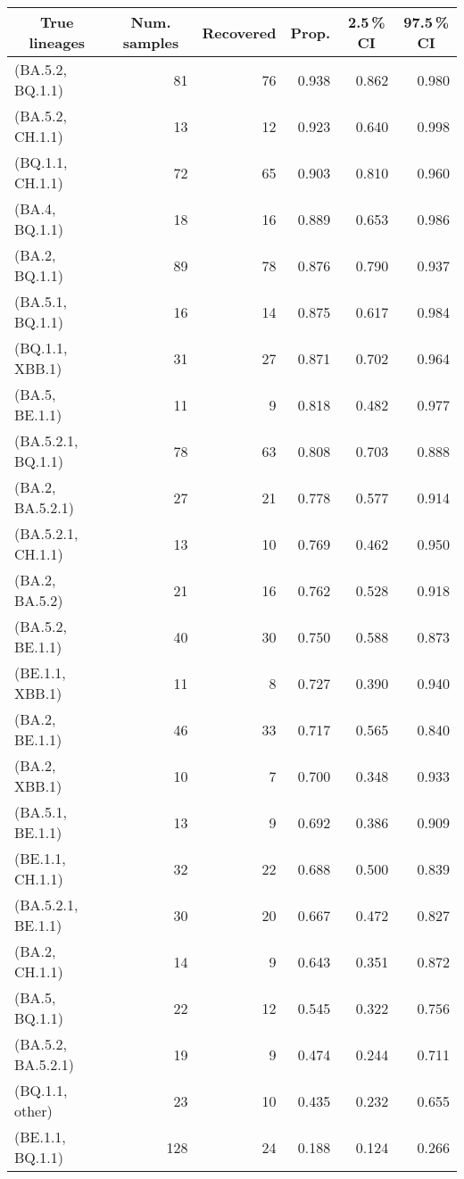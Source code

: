 \begin{tabular}{@{}lrrrrr@{}}
\toprule
\multicolumn{1}{c}{True lineages} & \multicolumn{1}{c}{Num. samples} & \multicolumn{1}{c}{Recovered} & \multicolumn{1}{c}{Prop.} & \multicolumn{1}{c}{2.5\,\% CI} & \multicolumn{1}{c}{97.5\,\% CI} \\
\midrule
(BA.5.2, BQ.1.1) & 81 & 76 & 0.938 & 0.862 & 0.980 \\
(BA.5.2, CH.1.1) & 13 & 12 & 0.923 & 0.640 & 0.998 \\
(BQ.1.1, CH.1.1) & 72 & 65 & 0.903 & 0.810 & 0.960 \\
(BA.4, BQ.1.1) & 18 & 16 & 0.889 & 0.653 & 0.986 \\
(BA.2, BQ.1.1) & 89 & 78 & 0.876 & 0.790 & 0.937 \\
(BA.5.1, BQ.1.1) & 16 & 14 & 0.875 & 0.617 & 0.984 \\
(BQ.1.1, XBB.1) & 31 & 27 & 0.871 & 0.702 & 0.964 \\
(BA.5, BE.1.1) & 11 & 9 & 0.818 & 0.482 & 0.977 \\
(BA.5.2.1, BQ.1.1) & 78 & 63 & 0.808 & 0.703 & 0.888 \\
(BA.2, BA.5.2.1) & 27 & 21 & 0.778 & 0.577 & 0.914 \\
(BA.5.2.1, CH.1.1) & 13 & 10 & 0.769 & 0.462 & 0.950 \\
(BA.2, BA.5.2) & 21 & 16 & 0.762 & 0.528 & 0.918 \\
(BA.5.2, BE.1.1) & 40 & 30 & 0.750 & 0.588 & 0.873 \\
(BE.1.1, XBB.1) & 11 & 8 & 0.727 & 0.390 & 0.940 \\
(BA.2, BE.1.1) & 46 & 33 & 0.717 & 0.565 & 0.840 \\
(BA.2, XBB.1) & 10 & 7 & 0.700 & 0.348 & 0.933 \\
(BA.5.1, BE.1.1) & 13 & 9 & 0.692 & 0.386 & 0.909 \\
(BE.1.1, CH.1.1) & 32 & 22 & 0.688 & 0.500 & 0.839 \\
(BA.5.2.1, BE.1.1) & 30 & 20 & 0.667 & 0.472 & 0.827 \\
(BA.2, CH.1.1) & 14 & 9 & 0.643 & 0.351 & 0.872 \\
(BA.5, BQ.1.1) & 22 & 12 & 0.545 & 0.322 & 0.756 \\
(BA.5.2, BA.5.2.1) & 19 & 9 & 0.474 & 0.244 & 0.711 \\
(BQ.1.1, other) & 23 & 10 & 0.435 & 0.232 & 0.655 \\
(BE.1.1, BQ.1.1) & 128 & 24 & 0.188 & 0.124 & 0.266 \\
\bottomrule
\end{tabular}

